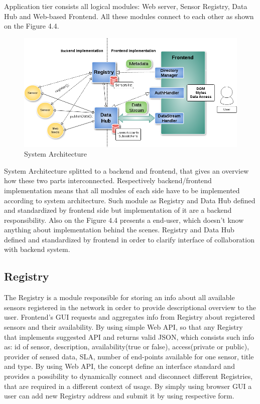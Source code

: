   Application tier consists all logical modules: Web server, Sensor Registry, Data Hub and Web-based Frontend. All these modules connect to each other as shown on the Figure 4.4. 
    \begin{figure}[!ht]
    \centering
    \includegraphics[scale=0.6]{images/Structure.png}   
    \caption[System Architecture]{System Architecture}                         
    \end{figure}

    System Architecture splitted to a backend and frontend, that gives an overview how these two parts interconnected. Respectively backend/frontend implementation means that all modules of each side have to be implemented according to system architecture. Such module as Registry and Data Hub defined and standardized by frontend side but implementation of it are a backend responsibility. Also on the Figure 4.4 presents a end-user, which doesn't know anything about implementation behind the scenes. Registry and Data Hub defined and standardized by frontend in order to clarify interface of collaboration with backend system.

  \subsection{Registry}
    The Registry is a module responsible for storing an info about all available sensors registered in the network in order to provide descriptional overview to the user. Frontend's GUI requests and aggregates info from Registry about registered sensors and their availability. By using simple Web API, so that any Registry that implements suggested API and returns valid JSON, which consists such info as: id of sensor, description, availability(true or false), access(private or public), provider of sensed data, SLA, number of end-points available for one sensor, title and type. By using Web API, the concept define an interface standard and provides a possibility to dynamically connect and disconnect different Registries, that are required in a different context of usage. By simply using browser GUI a user can add new Registry address and submit it by using respective form.

